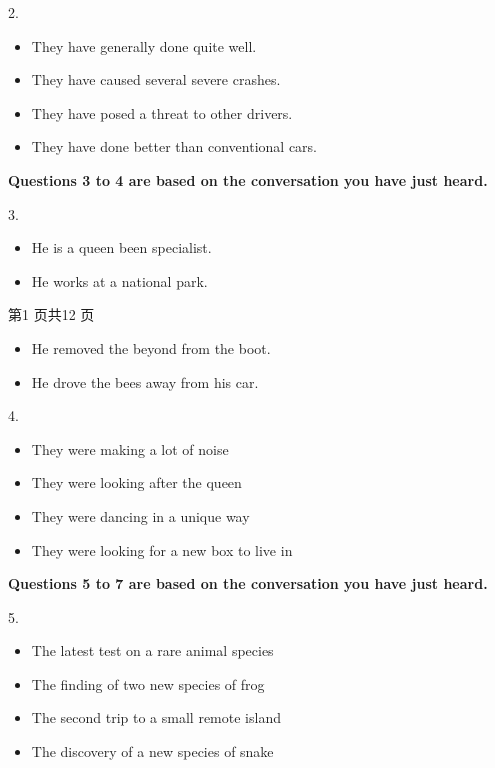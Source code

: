 \documentclass[UTF8,11pt]{ctexart}
\begin{document}
2.


\begin{itemize}[leftmargin=2em,itemsep=.2em,topsep=.4em]\item[A.] They have generally done quite well.
\item[B.] They have caused several severe crashes.
\item[C.] They have posed a threat to other drivers.
\item[D.] They have done better than conventional cars.
\end{itemize}

\textbf{Questions 3 to 4 are based on the conversation you have just heard.}


3.


\begin{itemize}[leftmargin=2em,itemsep=.2em,topsep=.4em]\item[A.] He is a queen been specialist.
\item[B.] He works at a national park.
\end{itemize}

第1 页共12 页


\begin{itemize}[leftmargin=2em,itemsep=.2em,topsep=.4em]\item[C.] He removed the beyond from the boot.
\item[D.] He drove the bees away from his car.
\end{itemize}

4.


\begin{itemize}[leftmargin=2em,itemsep=.2em,topsep=.4em]\item[A.] They were making a lot of noise
\item[B.] They were looking after the queen
\item[C.] They were dancing in a unique way
\item[D.] They were looking for a new box to live in
\end{itemize}

\textbf{Questions 5 to 7 are based on the conversation you have just heard.}


5.


\begin{itemize}[leftmargin=2em,itemsep=.2em,topsep=.4em]\item[A.] The latest test on a rare animal species
\item[B.] The finding of two new species of frog
\item[C.] The second trip to a small remote island
\item[D.] The discovery of a new species of snake
\end{itemize}
\end{document}
